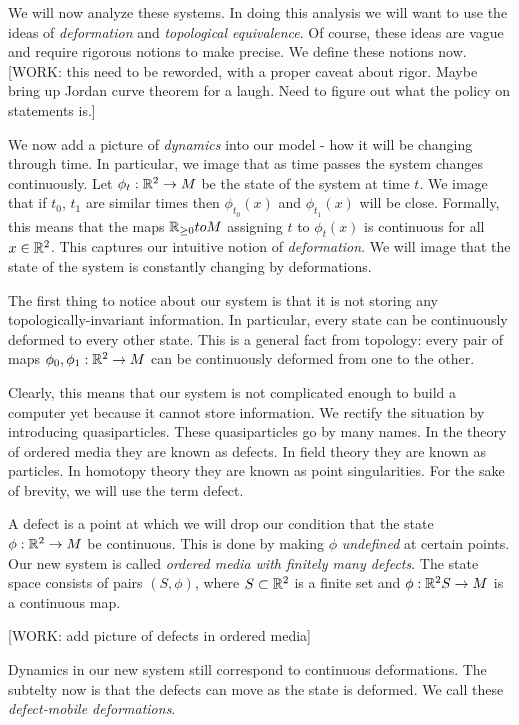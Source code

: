 We will now analyze these systems. In doing this analysis we will want to use the ideas of \textit{deformation} and \textit{topological equivalence}. Of course, these ideas are vague and require rigorous notions to make precise. We define these notions now. [WORK: this need to be reworded, with a proper caveat about rigor. Maybe bring up Jordan curve theorem for a laugh. Need to figure out what the policy on statements is.]

We now add a picture of \textit{dynamics} into our model - how it will be changing through time. In particular, we image that as time passes the system changes continuously. Let $\phi_t:\mathbb{R}^2\to M$ be the state of the system at time $t$. We image that if $t_0$, $t_1$ are similar times then $\phi_{t_0}(x)$ and $\phi_{t_1}(x)$ will be close. Formally, this means that the maps $\mathbb{R}_{\geq 0}to M$ assigning $t$ to $\phi_t(x)$ is continuous for all $x\in \mathbb{R}^2$. This captures our intuitive notion of \textit{deformation}. We will image that the state of the system is constantly changing by deformations.

The first thing to notice about our system is that it is not storing any topologically-invariant information. In particular, every state can be continuously deformed to every other state. This is a general fact from topology: every pair of maps $\phi_0,\phi_1: \mathbb{R}^2\to M$ can be continuously deformed from one to the other.

Clearly, this means that our system is not complicated enough to build a computer yet because it cannot store information. We rectify the situation by introducing quasiparticles. These quasiparticles go by many names. In the theory of ordered media they are known as defects. In field theory they are known as particles. In homotopy theory they are known as point singularities. For the sake of brevity, we will use the term defect.

A defect is a point at which we will drop our condition that the state $\phi:\mathbb{R}^2\to M$ be continuous. This is done by making $\phi$ \textit{undefined} at certain points. Our new system is called \textit{ordered media with finitely many defects}. The state space consists of pairs $(S,\phi)$, where $S\subset \mathbb{R}^2$ is a finite set and $\phi: \mathbb{R}^2\\ S\to M$ is a continuous map.

[WORK: add picture of defects in ordered media]

Dynamics in our new system still correspond to continuous deformations. The subtelty now is that the defects can move as the state is deformed. We call these \textit{defect-mobile deformations}.

